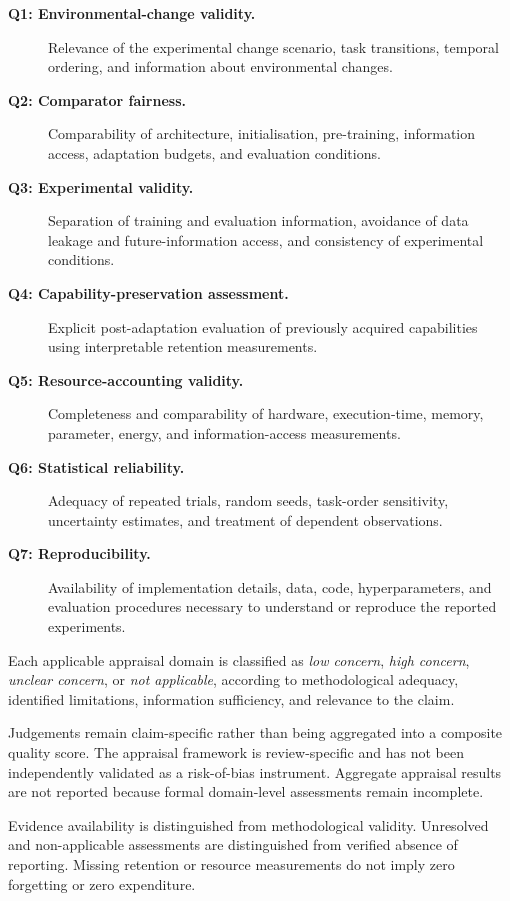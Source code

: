 \begin{description}
	\item[\textbf{Q1: Environmental-change validity.}]
	Relevance of the experimental change scenario,
	task transitions, temporal ordering, and
	information about environmental changes.
	
	\item[\textbf{Q2: Comparator fairness.}]
	Comparability of architecture, initialisation,
	pre-training, information access, adaptation
	budgets, and evaluation conditions.
	
	\item[\textbf{Q3: Experimental validity.}]
	Separation of training and evaluation
	information, avoidance of data leakage and
	future-information access, and consistency
	of experimental conditions.
	
	\item[\textbf{Q4: Capability-preservation assessment.}]
	Explicit post-adaptation evaluation of previously
	acquired capabilities using interpretable
	retention measurements.
	
	\item[\textbf{Q5: Resource-accounting validity.}]
	Completeness and comparability of hardware,
	execution-time, memory, parameter, energy,
	and information-access measurements.
	
	\item[\textbf{Q6: Statistical reliability.}]
	Adequacy of repeated trials, random seeds,
	task-order sensitivity, uncertainty estimates,
	and treatment of dependent observations.
	
	\item[\textbf{Q7: Reproducibility.}]
	Availability of implementation details, data,
	code, hyperparameters, and evaluation procedures
	necessary to understand or reproduce the
	reported experiments.
\end{description}

Each applicable appraisal domain is classified as
\emph{low concern}, \emph{high concern},
\emph{unclear concern}, or \emph{not applicable},
according to methodological adequacy, identified
limitations, information sufficiency, and relevance
to the claim.

Judgements remain claim-specific rather than being
aggregated into a composite quality score. The
appraisal framework is review-specific and has not
been independently validated as a risk-of-bias
instrument. Aggregate appraisal results are not
reported because formal domain-level assessments
remain incomplete.

Evidence availability is distinguished from
methodological validity. Unresolved and
non-applicable assessments are distinguished from
verified absence of reporting. Missing retention
or resource measurements do not imply zero
forgetting or zero expenditure.
